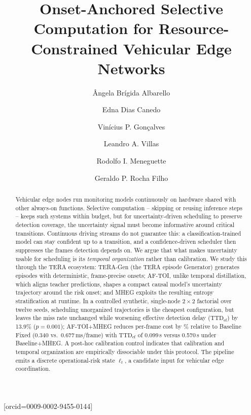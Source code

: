 \documentclass[a4paper,fleqn]{cas-dc}
\begin{document}
\title[mode=title]{Onset-Anchored Selective Computation for Resource-Constrained Vehicular Edge Networks}
\author[1]{{\^A}ngela Br\'igida Albarello}[orcid=0009-0002-9455-0144]
\cormark[1]
\author[1]{Edna Dias Canedo}
\author[1]{Vin\'icius P. Gon\c{c}alves}
\author[2]{Leandro A. Villas}
\author[3]{Rodolfo I. Meneguette}
\author[1,4]{Geraldo P. Rocha Filho}
\begin{abstract}
Vehicular edge nodes run monitoring models continuously on hardware shared
with other always-on functions. Selective
computation -- skipping or reusing inference steps -- keeps such systems
within budget, but for uncertainty-driven scheduling to preserve detection
coverage, the uncertainty signal must become informative around critical
transitions. Continuous driving streams do not guarantee this: a
classification-trained model can stay confident up to a transition, and a
confidence-driven scheduler then suppresses the frames detection depends on.
We argue that what makes uncertainty usable for scheduling is its
\emph{temporal organization} rather than calibration. We study this through
the TERA ecosystem: \mbox{TERA-Gen} (the TERA episode Generator) generates
episodes with deterministic, frame-precise onsets; \mbox{AF-TOI}, unlike
temporal distillation, which aligns teacher predictions, shapes a compact
causal model's uncertainty trajectory around the risk onset; and \mbox{MHEG}
exploits the resulting entropy stratification at runtime. In a controlled
synthetic, single-node $2\times2$ factorial over twelve seeds, scheduling
unorganized trajectories is the cheapest configuration, but leaves the miss
rate unchanged
while worsening effective detection delay ($\mathrm{TTD}_{\mathrm{ef}}$) by
13.9\% ($p=0.001$); \mbox{AF-TOI}+MHEG reduces per-frame cost by
\CostReduction\% relative to Baseline Fixed (0.340 vs.\ 0.677\,ms/frame) with
$\mathrm{TTD}_{\mathrm{ef}}$ of 0.099\,s versus 0.570\,s under Baseline+MHEG.
A post-hoc calibration control indicates that calibration and temporal
organization are empirically dissociable under this protocol. The pipeline emits a discrete
operational-risk state $\ell_t$, a candidate input for vehicular edge
coordination.
\end{abstract}
\end{document}
